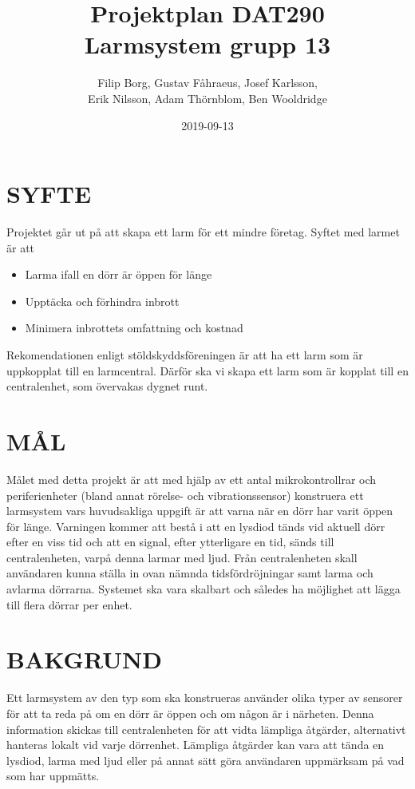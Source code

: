 \documentclass[a4paper]{article}
\title{Projektplan DAT290 \\ \Large Larmsystem grupp 13}
\author{Filip Borg, Gustav Fåhraeus, Josef Karlsson,\\
            Erik Nilsson, Adam Thörnblom, Ben Wooldridge}
\date{2019-09-13}
\begin{document}
\maketitle
{}
\newpage

\tableofcontents
\newpage



\section{SYFTE}
\label{sec:syfte}

Projektet går ut på att skapa ett larm för ett mindre företag. Syftet med larmet är att
\begin{itemize}
    \item Larma ifall en dörr är öppen för länge
    \item Upptäcka och förhindra inbrott
    \item Minimera inbrottets omfattning och kostnad

\end{itemize}
Rekomendationen enligt stöldskyddsföreningen är att ha ett larm
som är uppkopplat till en larmcentral. Därför ska vi skapa ett larm som är kopplat till en centralenhet,
 som övervakas dygnet runt.

\section{MÅL}
\label{sec:mål}

Målet med detta projekt är att med hjälp av ett antal mikrokontrollrar och periferienheter (bland annat rörelse- och vibrationssensor) konstruera ett larmsystem vars huvudsakliga uppgift är att varna när en dörr har varit öppen för länge. Varningen kommer att bestå i att en lysdiod tänds vid aktuell dörr efter en viss tid och att en signal, efter ytterligare en tid, sänds till centralenheten, varpå denna larmar med ljud. Från centralenheten skall användaren kunna ställa in ovan nämnda tidsfördröjningar samt larma och avlarma dörrarna. Systemet ska vara skalbart och således ha möjlighet att lägga till flera dörrar per enhet.

\section{BAKGRUND}
\label{sec:bakgrund}

Ett larmsystem av den typ som ska konstrueras använder olika typer av sensorer för att ta reda på om en dörr är öppen och om någon är i närheten. Denna information skickas till centralenheten för att vidta lämpliga åtgärder, alternativt hanteras lokalt vid varje dörrenhet.
Lämpliga åtgärder kan vara att tända en lysdiod, larma med ljud eller på annat sätt göra användaren uppmärksam på vad som har uppmätts.
\end{document}
